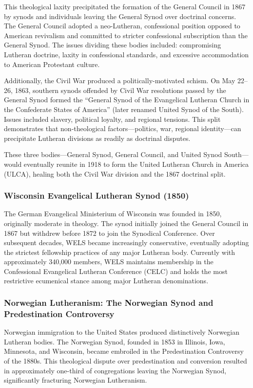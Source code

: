This theological laxity precipitated the formation of the General Council in 1867 by synods and individuals leaving the General Synod over doctrinal concerns. The General Council adopted a neo-Lutheran, confessional position opposed to American revivalism and committed to stricter confessional subscription than the General Synod. The issues dividing these bodies included: compromising Lutheran doctrine, laxity in confessional standards, and excessive accommodation to American Protestant culture.

Additionally, the Civil War produced a politically-motivated schism. On May 22--26, 1863, southern synods offended by Civil War resolutions passed by the General Synod formed the ``General Synod of the Evangelical Lutheran Church in the Confederate States of America'' (later renamed United Synod of the South). Issues included slavery, political loyalty, and regional tensions. This split demonstrates that non-theological factors---politics, war, regional identity---can precipitate Lutheran divisions as readily as doctrinal disputes.

These three bodies---General Synod, General Council, and United Synod South---would eventually reunite in 1918 to form the United Lutheran Church in America (ULCA), healing both the Civil War division and the 1867 doctrinal split.

\subsubsection{Wisconsin Evangelical Lutheran Synod (1850)}

The German Evangelical Ministerium of Wisconsin was founded in 1850, originally moderate in theology. The synod initially joined the General Council in 1867 but withdrew before 1872 to join the Synodical Conference. Over subsequent decades, WELS became increasingly conservative, eventually adopting the strictest fellowship practices of any major Lutheran body. Currently with approximately 340,000 members, WELS maintains membership in the Confessional Evangelical Lutheran Conference (CELC) and holds the most restrictive ecumenical stance among major Lutheran denominations.

\subsubsection{Norwegian Lutheranism: The Norwegian Synod and Predestination Controversy}

Norwegian immigration to the United States produced distinctively Norwegian Lutheran bodies. The Norwegian Synod, founded in 1853 in Illinois, Iowa, Minnesota, and Wisconsin, became embroiled in the Predestination Controversy of the 1880s. This theological dispute over predestination and conversion resulted in approximately one-third of congregations leaving the Norwegian Synod, significantly fracturing Norwegian Lutheranism.

